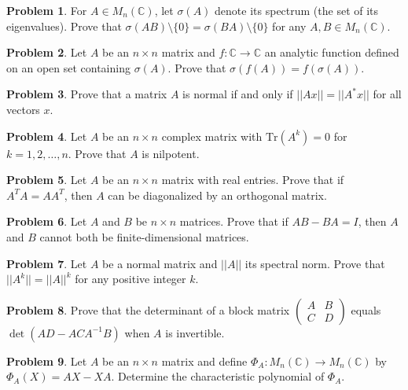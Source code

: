 \documentclass[12pt,a4paper]{article}
\theoremstyle{definition}
\newtheorem{problem}{Problem}[section]
\begin{document}
\begin{problem}
For $A \in M_n(\mathbb{C})$, let $\sigma(A)$ denote its spectrum (the set of its eigenvalues). Prove that $\sigma(AB) \setminus \{0\} = \sigma(BA) \setminus \{0\}$ for any $A, B \in M_n(\mathbb{C})$.
\end{problem}

\begin{problem}
Let $A$ be an $n \times n$ matrix and $f: \mathbb{C} \to \mathbb{C}$ an analytic function defined on an open set containing $\sigma(A)$. Prove that $\sigma(f(A)) = f(\sigma(A))$.
\end{problem}

\begin{problem}
Prove that a matrix $A$ is normal if and only if $||Ax|| = ||A^*x||$ for all vectors $x$.
\end{problem}

\begin{problem}
Let $A$ be an $n \times n$ complex matrix with $\text{Tr}(A^k) = 0$ for $k = 1, 2, \ldots, n$. Prove that $A$ is nilpotent.
\end{problem}

\begin{problem}
Let $A$ be an $n \times n$ matrix with real entries. Prove that if $A^T A = A A^T$, then $A$ can be diagonalized by an orthogonal matrix.
\end{problem}

\begin{problem}
Let $A$ and $B$ be $n \times n$ matrices. Prove that if $AB - BA = I$, then $A$ and $B$ cannot both be finite-dimensional matrices.
\end{problem}

\begin{problem}
Let $A$ be a normal matrix and $||A||$ its spectral norm. Prove that $||A^k|| = ||A||^k$ for any positive integer $k$.
\end{problem}

\begin{problem}
Prove that the determinant of a block matrix
$\begin{pmatrix} A & B \\ C & D \end{pmatrix}$
equals $\det(AD - ACA^{-1}B)$ when $A$ is invertible.
\end{problem}

\begin{problem}
Let $A$ be an $n \times n$ matrix and define $\Phi_A: M_n(\mathbb{C}) \to M_n(\mathbb{C})$ by $\Phi_A(X) = AX - XA$. Determine the characteristic polynomial of $\Phi_A$.
\end{problem}
\end{document}

